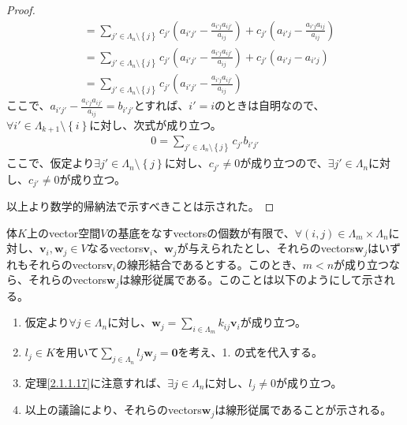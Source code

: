 \documentclass[dvipdfmx]{jsarticle}
\begin{document}
\begin{proof}
\begin{align*}
&= \sum_{j' \in \varLambda_{n} \setminus \left\{ j \right\}} {c_{j'}\left( a_{i'j'} - \frac{a_{i'j}a_{ij'}}{a_{ij}} \right)} + c_{j'}\left( a_{i'j} - \frac{a_{i'j}a_{ij}}{a_{ij}} \right)\\
&= \sum_{j' \in \varLambda_{n} \setminus \left\{ j \right\}} {c_{j'}\left( a_{i'j'} - \frac{a_{i'j}a_{ij'}}{a_{ij}} \right)} + c_{j'}\left( a_{i'j} - a_{i'j} \right)\\
&= \sum_{j' \in \varLambda_{n} \setminus \left\{ j \right\}} {c_{j'}\left( a_{i'j'} - \frac{a_{i'j}a_{ij'}}{a_{ij}} \right)}
\end{align*}
ここで、$a_{i'j'} - \frac{a_{i'j}a_{ij'}}{a_{ij}} = b_{i'j'}$とすれば、$i' = i$のときは自明なので、$\forall i' \in \varLambda_{k + 1} \setminus \left\{ i \right\}$に対し、次式が成り立つ。
\begin{align*}
0 = \sum_{j' \in \varLambda_{n} \setminus \left\{ j \right\}} {c_{j'}b_{i'j'}}
\end{align*}
ここで、仮定より$\exists j' \in \varLambda_{n} \setminus \left\{ j \right\}$に対し、$c_{j'} \neq 0$が成り立つので、$\exists j' \in \varLambda_{n}$に対し、$c_{j'} \neq 0$が成り立つ。\par
以上より数学的帰納法で示すべきことは示された。
\end{proof}
\begin{thm}\label{2.1.1.18}
体$K$上のvector空間$V$の基底をなすvectorsの個数が有限で、$\forall(i,j) \in \varLambda_{m} \times \varLambda_{n}$に対し、$\mathbf{v}_{i},\mathbf{w}_{j} \in V$なるvectors$\mathbf{v}_{i}$、$\mathbf{w}_{j}$が与えられたとし、それらのvectors$\mathbf{w}_{j}$はいずれもそれらのvectors$\mathbf{v}_{i}$の線形結合であるとする。このとき、$m < n$が成り立つなら、それらのvectors$\mathbf{w}_{j}$は線形従属である。このことは以下のようにして示される。
\begin{enumerate}
\item
  仮定より$\forall j \in \varLambda_{n}$に対し、$\mathbf{w}_{j} = \sum_{i \in \varLambda_{m}} {k_{ij}\mathbf{v}_{i}}$が成り立つ。
\item
  $l_{j} \in K$を用いて$\sum_{j \in \varLambda_{n}} {l_{j}\mathbf{w}_{j}} = \mathbf{0}$を考え、1.
  の式を代入する。
\item
  定理\ref{2.1.1.17}に注意すれば、$\exists j \in \varLambda_{n}$に対し、$l_{j} \neq 0$が成り立つ。
\item
  以上の議論により、それらのvectors$\mathbf{w}_{j}$は線形従属であることが示される。
\end{enumerate}
\end{thm}
\end{document}

